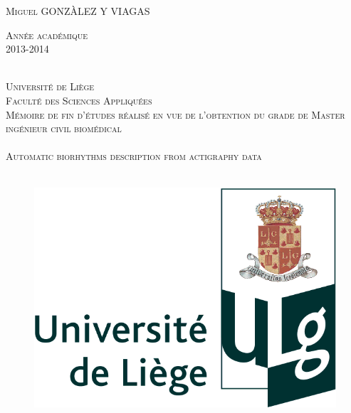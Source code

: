 \begin{titlepage}
\begin{center}


\begin{minipage}[ht]{0.48\textwidth}
\begin{flushleft} \large
\textsc{Miguel GONZÀLEZ Y VIAGAS}
\end{flushleft}
\end{minipage}
\begin{minipage}[ht]{0.48\textwidth}
\begin{flushright} \large
\textsc{Année académique \\ 2013-2014}
\end{flushright}
\end{minipage}\\[2cm]



\textsc{\LARGE Université de Liège} \\[1cm]
\textsc{\Large Faculté des Sciences Appliquées} \\[1cm]
\textsc{\large Mémoire de fin d'études réalisé en vue de l'obtention du grade de Master ingénieur civil biomédical} \\[1cm]


\HRule \\[4mm]
\textsc{\Large Automatic biorhythms description from actigraphy data} \\[1mm]
\HRule \\[3cm]

   \begin{figure}[H]
   \centering
\includegraphics[scale=0.25]{Images/logoULg.png}
   \end{figure}


\end{center}
\end{titlepage}
